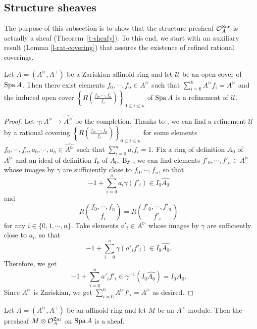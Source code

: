 \subsection{Structure sheaves}\label{ss-structure}

The purpose of this subsection is to show that the structure presheaf $\mathcal{O}_A^{{\operatorname{Zar}}}$ is actually a sheaf (Theorem~\ref{t-sheafy}). 
To this end, we start with an auxiliary result (Lemma \ref{l-rat-covering}) 
that assures the existence of refined rational coverings. 


\begin{lem}\label{l-rat-covering}
Let $A=(A^{\rhd}, A^+)$ be a Zariskian affinoid ring and 
let $\mathcal U$ be an open cover of ${\operatorname{Spa}}\,A$. 
Then there exist elements $f_0, \cdots, f_n \in A^{\rhd}$ 
such that $\sum_{i=0}^n A^{\rhd} f_i=A^{\rhd}$ and 
the induced open cover $\left\{R\left(\frac{f_0, \cdots, f_n}{f_i}\right)\right\}_{0 \leq i \leq n}$ of ${\operatorname{Spa}}\,A$ is a refinement of $\mathcal U$. 
\end{lem}




\begin{proof}
Let $\gamma:A^{\rhd} \to \widehat{A^{\rhd}}$ be the completion. 
Thanks to \cite[Lemma 2.6]{Hub94}, we can find a refinement 
$\mathcal U$ by a rational covering 
$\left\{R\left(\frac{f_0, \cdots, f_n}{f_i}\right)\right\}_{0 \leq i \leq n}$ 
for some elements $f_0, \cdots, f_n, a_0, \cdots, a_n \in \widehat{A^{\rhd}}$ 
such that $\sum_{i=0}^n a_if_i=1$. 
Fix a ring of definition $A_0$ of $A^{\rhd}$ and an ideal of definition $I_0$ of $A_0$. 
By \cite[Lemma 3.10]{Hub93}, 
we can find elements $f'_0, \cdots, f'_n \in A^{\rhd}$ 
whose images by $\gamma$ are sufficiently close to $f_0, \cdots, f_n$, 
so that 
$$-1+\sum_{i=0}^na_i\gamma(f'_i) \in I_0\widehat{A_0}$$ 
and 
$$R\left(\frac{f_0, \cdots, f_n}{f_i}\right)=
R\left(\frac{f'_0, \cdots, f'_n}{f'_i}\right)$$
for any $i \in \{0, 1, \cdots, n\}$. 
Take elements $a'_i \in A^{\rhd}$ whose images by $\gamma$ 
are sufficiently close to $a_i$, so that 
$$-1+\sum_{i=0}^n\gamma(a'_if'_i) \in I_0\widehat{A_0}.$$ 
Therefore, we get 
$$-1+\sum_{i=0}^na'_if'_i \in \gamma^{-1}(I_0\widehat{A_0})=I_0A_0.$$
Since $A^{\rhd}$ is Zariskian, we get $\sum_{i=0}^nA^{\rhd} f'_i=A^{\rhd}$ as desired. 
\end{proof}


\begin{thm}\label{t-sheafy}
Let $A=(A^{\rhd}, A^+)$ be an affinoid ring and let $M$ be an $A^{\rhd}$-module. 
Then the presheaf $M \otimes \mathcal{O}_A^{{\operatorname{Zar}}}$ on ${\operatorname{Spa}}\,A$ is a sheaf. 
\end{thm}


